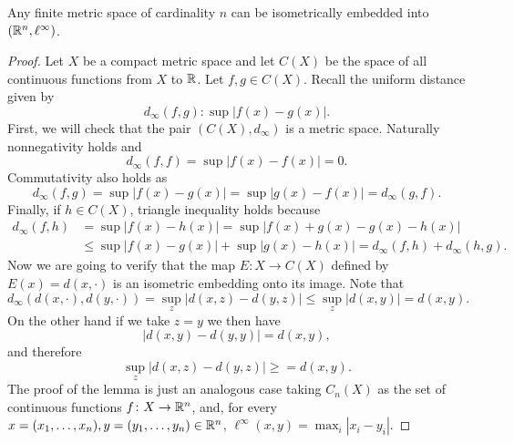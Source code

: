 \begin{lemma} \label{lemma:haus-aux-1}
    Any finite metric space of cardinality $ n $ can be isometrically embedded into $(\mathbb R^n, \ell^\infty)$.
\end{lemma}
\begin{proof}
    Let $ X $ be a compact metric space and let $ C(X) $ be the space of all continuous functions from $ X $ to $ \mathbb R $. Let $ f, g \in C(X) $. Recall the uniform distance given by
    \begin{equation}
        d_\infty(f, g) \colon \sup | f(x) - g(x) |.
    \end{equation}
    First, we will check that the pair $ (C(X), d_\infty) $ is a metric space. Naturally nonnegativity holds and 
    \begin{equation}
        d_\infty(f, f) = \sup | f(x) - f(x) | = 0.
    \end{equation}
    Commutativity also holds as 
    \begin{equation}
        d_\infty(f, g) = \sup | f(x) - g(x) | = \sup | g(x) - f(x) | = d_\infty(g, f).
    \end{equation}
    Finally, if $ h \in C(X) $, triangle inequality holds because
    \begin{align}
        d_\infty(f, h) &= \sup | f(x) - h(x) | = \sup | f(x) + g(x) - g(x) - h(x) | \\
        &\leq \sup | f(x)- g(x) | + \sup | g(x) - h(x) | = d_\infty(f, h) + d_\infty(h, g).
    \end{align}
    Now we are going to verify that the map $ E \colon X \to C(X) $ defined by $ E(x) = d(x, \cdot) $ is an isometric embedding onto its image. Note that
    \begin{equation}
        d_\infty(d(x, \cdot), d(y, \cdot)) = \sup_z |d(x, z) - d(y, z)| \leq  \sup_z |d(x, y)| = d(x, y).
    \end{equation}
    On the other hand if we take $ z = y $ we then have
    \begin{equation}
        |d(x, y) - d(y, y)| = d(x, y),
    \end{equation}
    and therefore
    \begin{equation}
        \sup_z |d(x, z) - d(y, z)| \geq = d(x, y).
    \end{equation}
    The proof of the lemma is just an analogous case taking $ C_n(X) $ as the set of continuous functions $ f \colon X \to \mathbb R^n $, and, for every $ x = (x_1, \dots, x_n), y = (y_1, \dots, y_n) \in \mathbb R^n $, $ \ell^\infty(x, y) = \max_i |x_i - y_i|$.
\end{proof}


